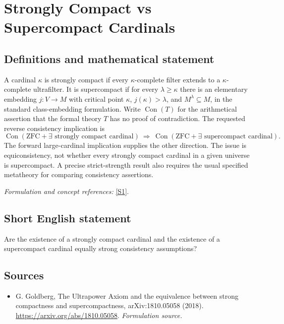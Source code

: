 \documentclass[11pt]{article}
\begin{document}
\section*{\texorpdfstring{Strongly Compact vs Supercompact Cardinals}{Strongly Compact vs Supercompact Cardinals}}\label{statement}
\subsection{Definitions and mathematical statement}
A cardinal $\kappa$ is strongly compact if every $\kappa$-complete filter extends to a $\kappa$-complete ultrafilter. It is supercompact if for every $\lambda\ge\kappa$ there is an elementary embedding $j:V\to M$ with critical point $\kappa$, $j(\kappa)>\lambda$, and $M^\lambda\subseteq M$, in the standard class-embedding formulation. Write $\operatorname{Con}(T)$ for the arithmetical assertion that the formal theory $T$ has no proof of contradiction. The requested reverse consistency implication is
\[
 \operatorname{Con}(\mathrm{ZFC}+\exists\text{ strongly compact cardinal})
 \ \Longrightarrow\
 \operatorname{Con}(\mathrm{ZFC}+\exists\text{ supercompact cardinal}).
\]
The forward large-cardinal implication supplies the other direction. The issue is equiconsistency, not whether every strongly compact cardinal in a given universe is supercompact. A precise strict-strength result also requires the usual specified metatheory for comparing consistency assertions.
\par\smallskip\textit{Formulation and concept references:} \href{https://arxiv.org/abs/1810.05058}{[S1]}.

\subsection{Short English statement}
Are the existence of a strongly compact cardinal and the existence of a supercompact cardinal equally strong consistency assumptions?
\subsection{Sources}
\begin{itemize}
\item[S1]G. Goldberg, The Ultrapower Axiom and the equivalence between strong compactness and supercompactness, arXiv:1810.05058 (2018).
\url{https://arxiv.org/abs/1810.05058}.
\textit{Formulation source.}
\end{itemize}
\end{document}
